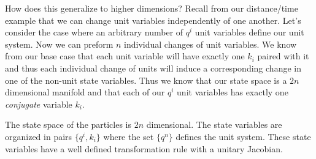 \documentclass{article}
\begin{document}
	How does this generalize to higher dimensions? Recall from our distance/time example that we can change unit variables independently of one another. Let's consider the case where an arbitrary number of $q^i$ unit variables define our unit system. Now we can preform $n$ individual changes of unit variables. We know from our base case that each unit variable will have exactly one $k_i$ paired with it and thus each individual change of units will induce a corresponding change in one of the non-unit state variables. Thus we know that our state space is a $2n$ dimensional manifold and that each of our $q^i$ unit variables has exactly one \textit{conjugate} variable $k_i$.

\begin{prop}
	The state space of the particles is $2n$ dimensional. The state variables are organized in pairs $\{q^i, k_i\}$ where the set $\{q^n\}$ defines the unit system. These state variables have a well defined transformation rule with a unitary Jacobian.
\end{prop}

	
	
	
\end{document}
